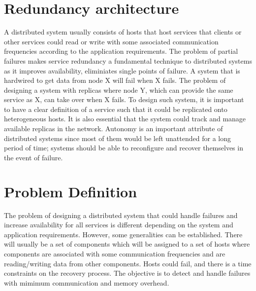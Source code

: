 \section{Redundancy architecture}

A distributed system usually consists of hosts that host services that clients or
other services could read or write with some associated communication
frequencies according to the application requirements. The
problem of partial failures makes service redundancy a fundamental technique to
distributed systems as it improves availability, eliminiates single points of
failure. A system that is hardwired to get data from node X will fail when
X fails. The problem of designing a system with replicas where node Y, which
can provide the same service as X, can take over when X fails. To design such
system, it is important to have a clear definition of a service such that it
could be replicated onto heterogeneous hosts. It is
also essential that the system could track and manage available replicas in the
network. Autonomy is an important attribute of distributed systems since most
of them would be left unattended for a long period of time; systems should be
able to reconfigure and recover themselves in the event of failure.

\section{Problem Definition}




The problem of designing a distributed system that could handle failures and
increase availability for all services is different depending on the system and
application requirements. However, some generalities can be established. There will
usually be a set of components which will be assigned to a set of hosts where 
components are associated with some communication frequencies and are
reading/writing data from other components. Hosts could fail, and there is
a time constraints on the recovery process. The objective is to detect and
handle failures with mimimum communication and memory overhead.

